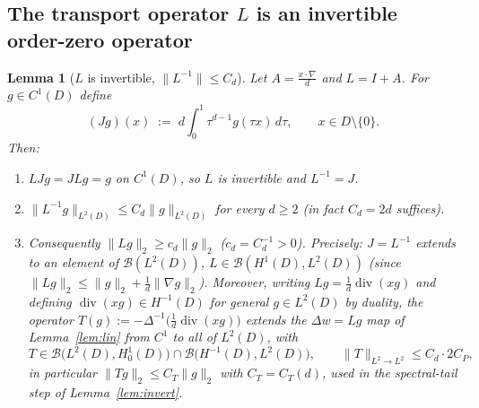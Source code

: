 \documentclass[11pt]{article}
\newtheorem{lemma}[theorem]{Lemma}
\theoremstyle{remark}
\newcommand{\norm}[1]{\lVert #1\rVert}
\newcommand{\SET}[1]{\{#1\}}
\DeclareMathOperator{\diver}{div}
\begin{document}
\subsection{The transport operator $L$ is an invertible order-zero operator}


\begin{lemma}[$L$ is invertible, $\norm{L^{-1}}\le C_{d}$]\label{lem:Linv}
Let $A=\frac{x\cdot\nabla}{d}$ and $L=I+A$. For $g\in C^{1}(D)$ define
\[
(Jg)(x)\;:=\;d\int_{0}^{1}\tau^{d-1}g(\tau x)\,d\tau ,
\qquad x\in D\setminus\SET{0}.
\]
Then:
\begin{enumerate}[label=(\roman*),itemsep=1pt]
\item $LJg=JLg=g$ on $C^{1}(D)$, so $L$ is invertible and $L^{-1}=J$.
\item $\norm{L^{-1}g}_{L^{2}(D)}\le C_{d}\norm{g}_{L^{2}(D)}$ for every
$d\ge2$ (in fact $C_d=2d$ suffices).
\item Consequently $\norm{Lg}_{2}\ge c_d\norm{g}_{2}$ ($c_d=C_d^{-1}>0$).
Precisely: $J=L^{-1}$ extends to an element of $\mathcal B(L^{2}(D))$,
$L\in\mathcal B(H^{1}(D),L^{2}(D))$ (since
$\norm{Lg}_2\le\norm{g}_2+\frac1d\norm{\nabla g}_2$). Moreover, writing
$Lg=\frac1d\diver(xg)$ and defining $\diver(xg)\in H^{-1}(D)$ for general
$g\in L^{2}(D)$ by duality, the operator
$T(g):=-\Delta^{-1}\bigl(\tfrac1d\diver(xg)\bigr)$ extends the
$\Delta w=Lg$ map of Lemma~\ref{lem:lin} from $C^{1}$ to all of
$L^{2}(D)$, with
\[
T\in\mathcal B\bigl(L^{2}(D),H^{1}_{0}(D)\bigr)
\cap\mathcal B\bigl(H^{-1}(D),L^{2}(D)\bigr),
\qquad\norm{T}_{L^{2}\to L^{2}}\le C_{d}\cdot 2C_{P},
\]
in particular $\norm{Tg}_{2}\le C_{T}\norm{g}_{2}$ with
$C_T=C_{T}(d)$, used in the spectral-tail step of
Lemma~\ref{lem:invert}.
\end{enumerate}
\end{lemma}
\end{document}

